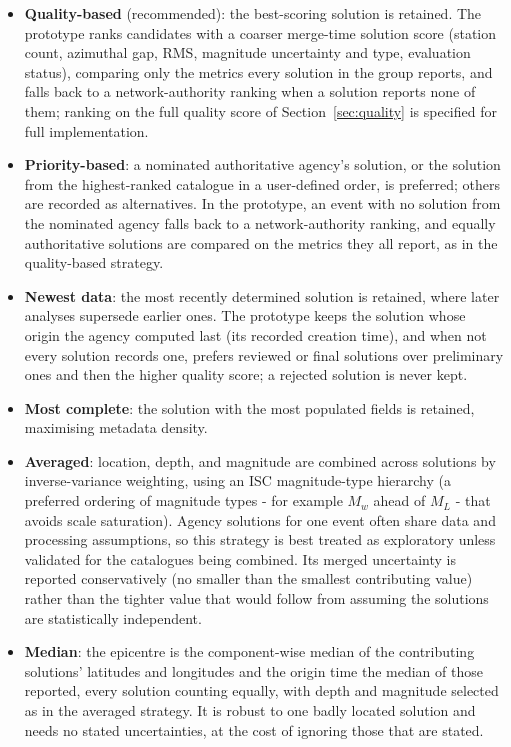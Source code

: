 \documentclass[11pt]{article}
\begin{document}
\begin{itemize}
  \item \textbf{Quality-based} (recommended): the best-scoring solution is retained. The prototype ranks candidates with a coarser merge-time solution score (station count, azimuthal gap, RMS, magnitude uncertainty and type, evaluation status), comparing only the metrics every solution in the group reports, and falls back to a network-authority ranking when a solution reports none of them; ranking on the full quality score of Section~\ref{sec:quality} is specified for full implementation.
  \item \textbf{Priority-based}: a nominated authoritative agency's solution, or the solution from the highest-ranked catalogue in a user-defined order, is preferred; others are recorded as alternatives. In the prototype, an event with no solution from the nominated agency falls back to a network-authority ranking, and equally authoritative solutions are compared on the metrics they all report, as in the quality-based strategy.
  \item \textbf{Newest data}: the most recently determined solution is retained, where later analyses supersede earlier ones. The prototype keeps the solution whose origin the agency computed last (its recorded creation time), and when not every solution records one, prefers reviewed or final solutions over preliminary ones and then the higher quality score; a rejected solution is never kept.
  \item \textbf{Most complete}: the solution with the most populated fields is retained, maximising metadata density.
  \item \textbf{Averaged}: location, depth, and magnitude are combined across solutions by inverse-variance weighting, using an ISC magnitude-type hierarchy (a preferred ordering of magnitude types - for example $M_w$ ahead of $M_L$ - that avoids scale saturation). Agency solutions for one event often share data and processing assumptions, so this strategy is best treated as exploratory unless validated for the catalogues being combined. Its merged uncertainty is reported conservatively (no smaller than the smallest contributing value) rather than the tighter value that would follow from assuming the solutions are statistically independent.
  \item \textbf{Median}: the epicentre is the component-wise median of the contributing solutions' latitudes and longitudes and the origin time the median of those reported, every solution counting equally, with depth and magnitude selected as in the averaged strategy. It is robust to one badly located solution and needs no stated uncertainties, at the cost of ignoring those that are stated.
\end{itemize}
\end{document}

